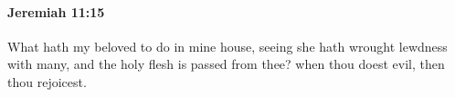 
		\paragraph{Jeremiah 11:15} %
			\label{JEREMIAH-11-15}

			What hath my beloved to do in mine house, seeing she hath wrought lewdness with many, and the holy flesh is passed from thee? when thou doest evil, then thou rejoicest.


